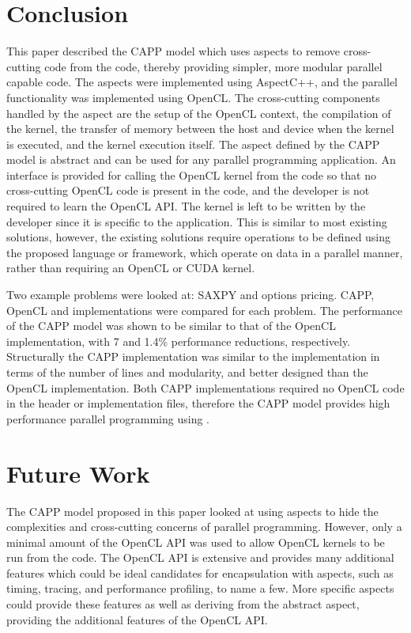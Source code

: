 \documentclass{sig-alternate-05-2015}
\begin{document}
\section{Conclusion}\label{sec:conclusion}

This paper described the CAPP model which uses aspects to remove
cross-cutting code from the \CPP code, thereby providing simpler, more modular
parallel capable \CPP code. The aspects were implemented using AspectC++,
and the parallel functionality was implemented using OpenCL. The cross-cutting 
components handled by the aspect are the setup of the OpenCL
context, the compilation of the kernel, the transfer of memory between the 
host and device when the kernel is executed, and the kernel execution itself. 
The aspect defined by the CAPP model is abstract and can be used for 
any parallel programming application. An interface is provided for calling the 
OpenCL kernel from the \CPP code so that no cross-cutting OpenCL code is present in
the \CPP code, and the developer is not required to learn the OpenCL API. The
kernel is left to be written by the developer since it is specific to the
application. This is similar to most existing solutions, however, the existing
solutions require operations to be defined using the proposed language or
framework, which operate on data in a parallel manner, rather than requiring an
OpenCL or CUDA kernel.

Two example problems were looked at: SAXPY and options pricing. CAPP, OpenCL 
and \CPP implementations were compared for each problem. The performance of the 
CAPP model was shown to be similar to that of the OpenCL
implementation, with 7 and 1.4\% performance reductions, respectively. Structurally 
the CAPP implementation was similar 
to the \CPP  implementation in terms of the number of lines and modularity, and
better designed than the OpenCL implementation. Both CAPP implementations
required no OpenCL code in the \CPP header or implementation files, therefore the
CAPP model provides high performance parallel programming using \CPP.

\section{Future Work}\label{sec:future}

The CAPP model proposed in this paper looked at using aspects to hide
the complexities and cross-cutting concerns of parallel programming. However, only a
minimal amount of the OpenCL API was used to allow OpenCL kernels to be run from the
\CPP code. The OpenCL API is extensive and provides many additional features which 
could be ideal candidates for encapsulation with aspects, such as timing,
tracing, and performance profiling, to name a few. More specific aspects could
provide these features as well as deriving from the abstract aspect, providing
the additional features of the OpenCL API.
\end{document}
